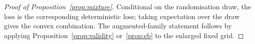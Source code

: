\begin{proof}[Proof of Proposition~\ref{prop:mixture}]
Conditional on the randomisation draw, the loss is the corresponding deterministic loss; taking expectation over the draw gives the convex combination. The augmented-family statement follows by applying Proposition~\ref{prop:validity} or~\ref{prop:eb} to the enlarged fixed grid.
\end{proof}
